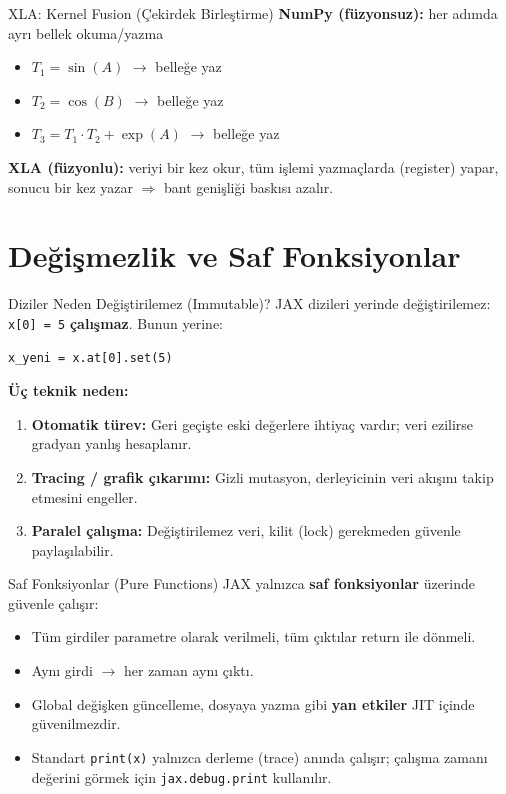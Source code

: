 \documentclass[aspectratio=169]{beamer}
\begin{document}
\begin{frame}{XLA: Kernel Fusion (Çekirdek Birleştirme)}
  \textbf{NumPy (füzyonsuz):} her adımda ayrı bellek okuma/yazma
  \begin{itemize}
    \item $T_1 = \sin(A)$ \quad $\to$ belleğe yaz
    \item $T_2 = \cos(B)$ \quad $\to$ belleğe yaz
    \item $T_3 = T_1 \cdot T_2 + \exp(A)$ \quad $\to$ belleğe yaz
  \end{itemize}

  \vspace{0.3cm}
  \textbf{XLA (füzyonlu):} veriyi bir kez okur, tüm işlemi yazmaçlarda (register) yapar, sonucu bir kez yazar $\Rightarrow$ bant genişliği baskısı azalır.
\end{frame}

\section{Değişmezlik ve Saf Fonksiyonlar}

\begin{frame}[fragile]{Diziler Neden Değiştirilemez (Immutable)?}
  JAX dizileri yerinde değiştirilemez: \texttt{x[0] = 5} \textbf{çalışmaz}. Bunun yerine:
  \begin{lstlisting}
x_yeni = x.at[0].set(5)
  \end{lstlisting}
  \textbf{Üç teknik neden:}
  \begin{enumerate}
    \item \textbf{Otomatik türev:} Geri geçişte eski değerlere ihtiyaç vardır; veri ezilirse gradyan yanlış hesaplanır.
    \item \textbf{Tracing / grafik çıkarımı:} Gizli mutasyon, derleyicinin veri akışını takip etmesini engeller.
    \item \textbf{Paralel çalışma:} Değiştirilemez veri, kilit (lock) gerekmeden güvenle paylaşılabilir.
  \end{enumerate}
\end{frame}

\begin{frame}{Saf Fonksiyonlar (Pure Functions)}
  JAX yalnızca \textbf{saf fonksiyonlar} üzerinde güvenle çalışır:
  \begin{itemize}
    \item Tüm girdiler parametre olarak verilmeli, tüm çıktılar return ile dönmeli.
    \item Aynı girdi $\to$ her zaman aynı çıktı.
    \item Global değişken güncelleme, dosyaya yazma gibi \textbf{yan etkiler} JIT içinde güvenilmezdir.
    \item Standart \texttt{print(x)} yalnızca derleme (trace) anında çalışır; çalışma zamanı değerini görmek için \texttt{jax.debug.print} kullanılır.
  \end{itemize}
\end{frame}
\end{document}
